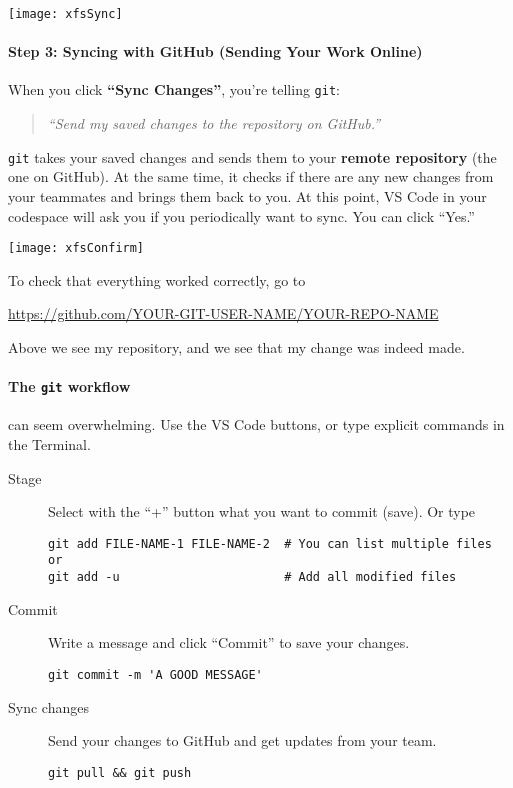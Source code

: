 \documentclass{ximera}
\begin{document}
\newpage

\begin{image}
    \texttt{[image: xfsSync]}
\end{image}
\paragraph{Step 3: Syncing with GitHub (Sending Your Work Online)}
When you click \textbf{``Sync Changes''}, you're telling \verb!git!:
\begin{quote}
    \emph{``Send my saved changes to the repository on GitHub.''}
\end{quote}
\verb!git! takes your saved changes and sends them to your \textbf{remote
    repository}
(the one on GitHub). At the same time, it checks if there are any new
changes from your teammates and brings them back to you. At this point,
VS Code in your codespace will ask you if you periodically want to sync.
You can click ``Yes.''
\pdfOnly{\end{multicols*}}

\newpage

\begin{image}
    \texttt{[image: xfsConfirm]}
\end{image}
To check that everything worked correctly, go to
\begin{center}
    \url{https://github.com/YOUR-GIT-USER-NAME/YOUR-REPO-NAME}
\end{center}
Above we see my repository, and we see that my change was indeed made.


\paragraph{The \texttt{git} workflow} can seem overwhelming. Use the VS Code buttons, or type explicit commands in the Terminal.
\begin{description}
    \item[Stage] Select with the ``+'' button what you want to
        commit (save). Or type
{\footnotesize
\begin{verbatim}
git add FILE-NAME-1 FILE-NAME-2  # You can list multiple files or
git add -u                       # Add all modified files 
\end{verbatim}
}
    \item[Commit] Write a message and click ``Commit'' to save
          your changes. 
\begin{verbatim}
git commit -m 'A GOOD MESSAGE'
\end{verbatim}
\pdfOnly{\end{description}}
\pdfOnly{\begin{minipage}{\columnwidth}}
\pdfOnly{\begin{description}}    
    \item[Sync changes] Send your changes to GitHub and get updates from
          your  team.
\begin{verbatim}
git pull && git push
\end{verbatim}
\end{description}
\end{document}
